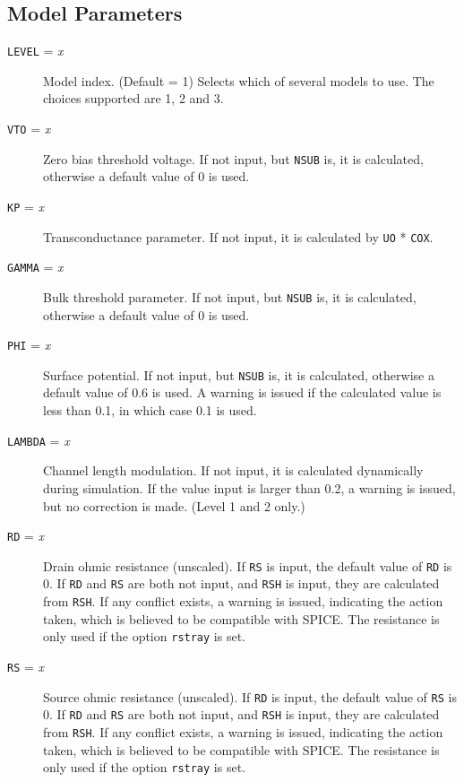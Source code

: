 \subsection{Model Parameters}

\begin{description}

\item[{\tt LEVEL} = {\it x}] Model index. (Default = 1) Selects which of
several models to use.  The choices supported are 1, 2 and 3.

\item[{\tt VTO} = {\it x}] Zero bias threshold voltage.  If not input, but
{\tt NSUB} is, it is calculated, otherwise a default value of 0 is used.

\item[{\tt KP} = {\it x}] Transconductance parameter.  If not input, it is
calculated by {\tt UO} * {\tt COX}.

\item[{\tt GAMMA} = {\it x}] Bulk threshold parameter.  If not input, but
{\tt NSUB} is, it is calculated, otherwise a default value of 0 is used.

\item[{\tt PHI} = {\it x}] Surface potential.  If not input, but {\tt NSUB}
is, it is calculated, otherwise a default value of 0.6 is used.  A warning
is issued if the calculated value is less than 0.1, in which case 0.1 is
used.

\item[{\tt LAMBDA} = {\it x}] Channel length modulation.  If not input, it
is calculated dynamically during simulation.  If the value input is larger
than 0.2, a warning is issued, but no correction is made.  (Level
1 and 2 only.)

\item[{\tt RD} = {\it x}] Drain ohmic resistance (unscaled).  If {\tt RS} is input, the
default value of {\tt RD} is 0.  If {\tt RD} and {\tt RS} are both not
input, and {\tt RSH} is input, they are calculated from {\tt RSH}.  If any
conflict exists, a warning is issued, indicating the action taken, which is
believed to be compatible with SPICE.    The resistance is only used if the
option {\tt rstray} is set.

\item[{\tt RS} = {\it x}] Source ohmic resistance (unscaled).  If {\tt RD} is input, the
default value of {\tt RS} is 0.  If {\tt RD} and {\tt RS} are both not
input, and {\tt RSH} is input, they are calculated from {\tt RSH}.  If any
conflict exists, a warning is issued, indicating the action taken, which is
believed to be compatible with SPICE.    The resistance is only used if the 
option {\tt rstray} is set.


\end{description}
